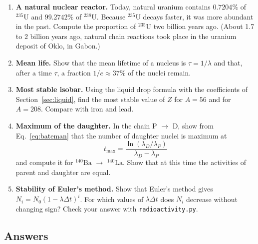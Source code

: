 \documentclass[11pt,a4paper]{article}
\newcommand{\iso}[2]{\ensuremath{{}^{#1}\mathrm{#2}}}         %
\begin{document}
\begin{enumerate}[label=\textbf{\arabic*.}]
  \item \textbf{A natural nuclear reactor.} Today, natural uranium contains $0.7204\%$ of \iso{235}{U} and $99.2742\%$ of \iso{238}{U}. Because \iso{235}{U} decays faster, it was more abundant in the past. Compute the proportion of \iso{235}{U} two billion years ago. (About 1.7 to 2 billion years ago, natural chain reactions took place in the uranium deposit of Oklo, in Gabon.)

  \item[$\star$\textbf{11.}] \textbf{Mean life.} Show that the mean lifetime of a nucleus is $\tau = 1/\lambda$ and that, after a time $\tau$, a fraction $1/e \approx 37\%$ of the nuclei remain.

  \item[$\star$\textbf{12.}] \textbf{Most stable isobar.} Using the liquid drop formula with the coefficients of Section~\ref{sec:liquid}, find the most stable value of $Z$ for $A = 56$ and for $A = 208$. Compare with iron and lead.

  \item[$\star$\textbf{13.}] \textbf{Maximum of the daughter.} In the chain P $\to$ D, show from Eq.~\eqref{eq:bateman} that the number of daughter nuclei is maximum at
  \[
  t_{\max} = \frac{\ln(\lambda_D/\lambda_P)}{\lambda_D - \lambda_P}
  \]
  and compute it for \iso{140}{Ba} $\to$ \iso{140}{La}. Show that at this time the activities of parent and daughter are equal.

  \item[$\star$\textbf{14.}] \textbf{Stability of Euler's method.} Show that Euler's method gives $N_i = N_0 (1 - \lambda \Delta t)^i$. For which values of $\lambda \Delta t$ does $N_i$ decrease without changing sign? Check your answer with \texttt{radioactivity.py}.
\end{enumerate}

\subsection*{Answers}
\end{document}
